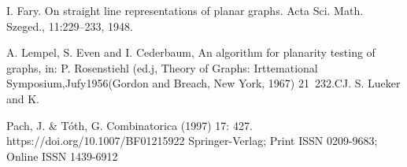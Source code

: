 \begin{thebibliography}{9}
I. Fary. On straight line representations of planar graphs. Acta Sci. Math. Szeged., 11:229–233, 1948.



A. Lempel, S. Even and I. Cederbaum, An algorithm for planarity testing of graphs, in: P. 
Rosenstiehl (ed.j, Theory of Graphs: Irttemational Symposium,Jufy1956(Gordon and Breach, New York, 1967)  21~232.CJ. S. Lueker and  K.

Pach, J. & Tóth, G. Combinatorica (1997) 17: 427. https://doi.org/10.1007/BF01215922 Springer-Verlag; Print ISSN 0209-9683; Online ISSN 1439-6912


\end{thebibliography}
\endinput

